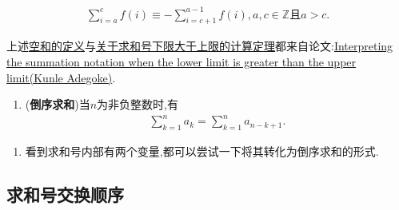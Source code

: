 \documentclass[lang=cn,newtx,10pt,scheme=chinese]{elegantbook}
\begin{document}
\begin{theorem}[关于求和号下限大于上限的计算]\label{theorem:关于求和号下限大于上限的计算}
\begin{align}
\sum\limits_{i=a}^c{f(i)}\equiv -\sum\limits_{i=c+1}^{a-1}{f(i),a,c}\in \mathbb{Z}\text{且} a>c. 
\end{align}
\end{theorem}
\begin{note}
上述\hyperref[definition:空和(Empty sum)]{空和的定义}与\hyperref[theorem:关于求和号下限大于上限的计算]{关于求和号下限大于上限的计算定理}都来自论文:\href{https://vixra.org/pdf/1601.0207v1.pdf}{Interpreting the summation notation when
the lower limit is greater than the upper limit(Kunle Adegoke)}.
\end{note}

\begin{theorem}[求和号基本性质]\label{theorem:求和号基本性质}
\begin{enumerate}
\item\label{theorem:求和号基本性质1} (\textbf{倒序求和})当$n$为非负整数时,有
\begin{align*}
\sum\limits_{k=1}^n{a_k}=\sum\limits_{k=1}^n{a_{n-k+1}}.
\end{align*}
\end{enumerate}
\begin{note}
\begin{enumerate}
\item 看到求和号内部有两个变量,都可以尝试一下将其转化为倒序求和的形式.
\end{enumerate}
\end{note}

\end{theorem}

\subsection{求和号交换顺序}
\end{document}
